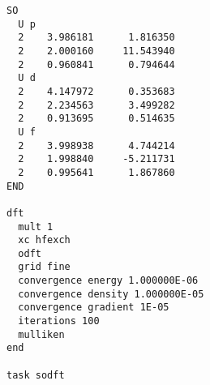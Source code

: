 \begin{verbatim}
SO
  U p
  2    3.986181      1.816350
  2    2.000160     11.543940
  2    0.960841      0.794644
  U d
  2    4.147972      0.353683
  2    2.234563      3.499282
  2    0.913695      0.514635
  U f
  2    3.998938      4.744214
  2    1.998840     -5.211731
  2    0.995641      1.867860
END

dft
  mult 1
  xc hfexch
  odft
  grid fine
  convergence energy 1.000000E-06
  convergence density 1.000000E-05
  convergence gradient 1E-05
  iterations 100
  mulliken
end

task sodft
\end{verbatim}
